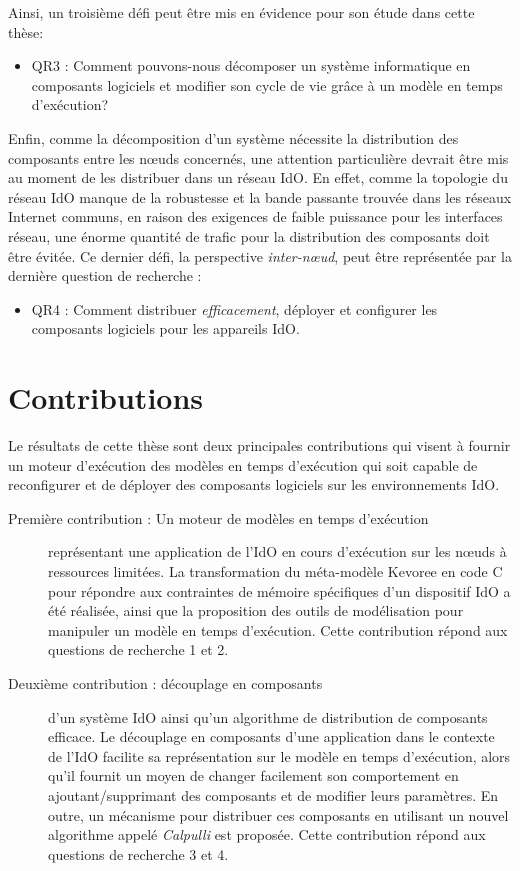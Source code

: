 Ainsi, un troisi\`eme d\'efi peut \^etre mis en \'evidence pour son \'etude dans cette th\`ese:

\begin{itemize}
	\item QR3 : Comment pouvons-nous d\'ecomposer un syst\`eme informatique en composants logiciels et modifier son cycle de vie gr\^ace \`a un mod\`ele en temps d'ex\'ecution?
\end{itemize}

Enfin, comme la d\'ecomposition d'un syst\`eme n\'ecessite la distribution des composants entre les n\oe{}uds concern\'es, une attention particuli\`ere devrait \^etre mis au moment de les distribuer dans un r\'eseau IdO.
En effet, comme la topologie du r\'eseau IdO manque de la robustesse et la bande passante trouv\'ee dans les r\'eseaux Internet communs, en raison des exigences de faible puissance pour les interfaces r\'eseau, une \'enorme quantit\'e de trafic pour la distribution des composants doit \^etre \'evit\'ee.
Ce dernier d\'efi, la perspective \textit{inter-n\oe{}ud}, peut \^etre repr\'esent\'ee par la derni\`ere question de recherche :

\begin{itemize}
	\item QR4 : Comment distribuer \textit{efficacement}, d\'eployer et configurer les composants logiciels pour les appareils IdO.
\end{itemize}

\section*{Contributions}
Le r\'esultats de cette th\`ese sont deux principales contributions qui visent \`a fournir un moteur d'ex\'ecution des mod\`eles en temps d'ex\'ecution qui soit capable de reconfigurer et de d\'eployer des composants logiciels sur les environnements IdO.
\begin{description}
	\item[Premi\`ere contribution : Un moteur de mod\`eles en temps d'ex\'ecution] repr\'esentant une application de l'IdO en cours d'ex\'ecution sur les n\oe{}uds \`a ressources limit\'ees. La transformation du méta-modèle Kevoree en code C pour r\'epondre aux contraintes de m\'emoire sp\'ecifiques d'un dispositif IdO a \'et\'e r\'ealis\'ee, ainsi que la proposition des outils de mod\'elisation pour manipuler un mod\`ele en temps d'ex\'ecution.
	Cette contribution r\'epond aux questions de recherche 1 et 2.
	\item[Deuxième contribution : découplage en composants] d'un syst\`eme IdO ainsi qu'un algorithme de distribution de composants efficace. Le découplage en composants d'une application dans le contexte de l'IdO facilite sa repr\'esentation sur le mod\`ele en temps d'ex\'ecution, alors qu'il fournit un moyen de changer facilement son comportement en ajoutant/supprimant des composants et de modifier leurs param\`etres.
	En outre, un m\'ecanisme pour distribuer ces composants en utilisant un nouvel algorithme appel\'e \emph{Calpulli} est proposée.
	Cette contribution r\'epond aux questions de recherche 3 et 4.
\end{description}